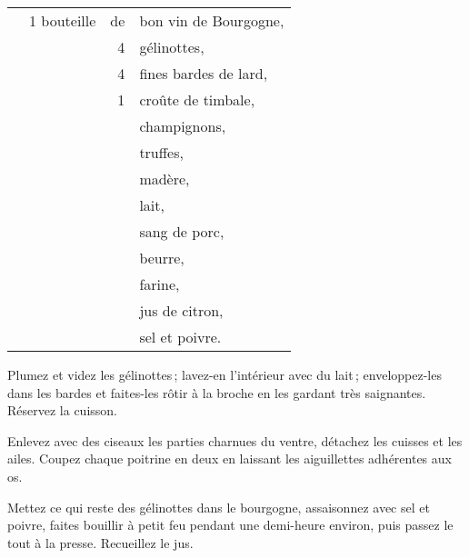 \footnotesize
\begin{longtable}{rrrp{16em}}
      & 1 bouteille & de & bon vin de Bourgogne,                                                          \\
      &             &  4 & gélinottes,                                                                    \\
      &             &  4 & fines bardes de lard,                                                          \\
      &             &  1 & croûte de timbale,                                                             \\
      &             &    & champignons,                                                                   \\
      &             &    & truffes,                                                                       \\
      &             &    & madère,                                                                        \\
      &             &    & lait,                                                                          \\
      &             &    & sang de porc,                                                                  \\
      &             &    & beurre,                                                                        \\
      &             &    & farine,                                                                        \\
      &             &    & jus de citron,                                                                 \\
      &             &    & sel et poivre.                                                                 \\
\end{longtable}
\normalsize

Plumez et videz les gélinottes ; lavez-en l'intérieur avec du lait ;
enveloppez-les dans les bardes et faites-les rôtir à la broche en les gardant
très saignantes. Réservez la cuisson.

Enlevez avec des ciseaux les parties charnues du ventre, détachez les cuisses et
les ailes. Coupez chaque poitrine en deux en laissant les aiguillettes adhérentes
aux os.

Mettez ce qui reste des gélinottes dans le bourgogne, assaisonnez avec sel et
poivre, faites bouillir à petit feu pendant une demi-heure environ, puis passez
le tout à la presse. Recueillez le jus.

